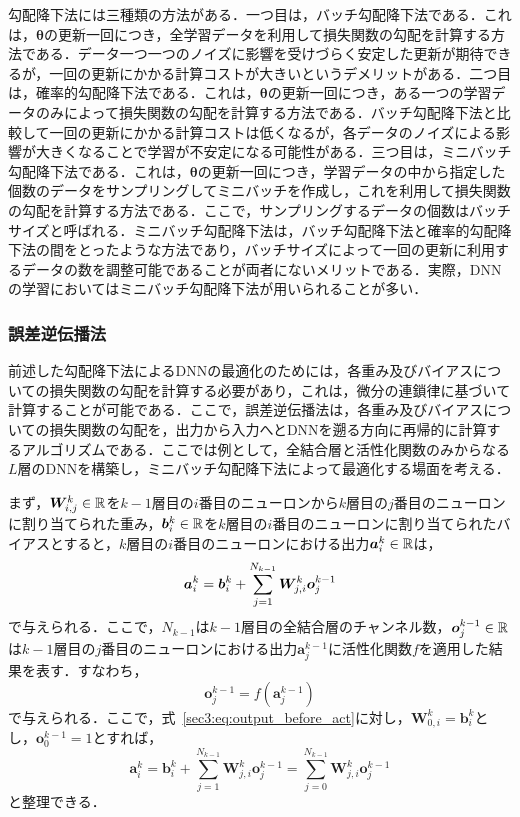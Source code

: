 \documentclass[12pt]{jarticle}
\numberwithin{equation}{section}    %
\numberwithin{figure}{section}      %
\numberwithin{table}{section}      %
\begin{document}
勾配降下法には三種類の方法がある．一つ目は，バッチ勾配降下法である．これは，$\bm{\theta}$の更新一回につき，全学習データを利用して損失関数の勾配を計算する方法である．データ一つ一つのノイズに影響を受けづらく安定した更新が期待できるが，一回の更新にかかる計算コストが大きいというデメリットがある．二つ目は，確率的勾配降下法である．これは，$\bm{\theta}$の更新一回につき，ある一つの学習データのみによって損失関数の勾配を計算する方法である．バッチ勾配降下法と比較して一回の更新にかかる計算コストは低くなるが，各データのノイズによる影響が大きくなることで学習が不安定になる可能性がある．三つ目は，ミニバッチ勾配降下法である．これは，$\bm{\theta}$の更新一回につき，学習データの中から指定した個数のデータをサンプリングしてミニバッチを作成し，これを利用して損失関数の勾配を計算する方法である．ここで，サンプリングするデータの個数はバッチサイズと呼ばれる．ミニバッチ勾配降下法は，バッチ勾配降下法と確率的勾配降下法の間をとったような方法であり，バッチサイズによって一回の更新に利用するデータの数を調整可能であることが両者にないメリットである．実際，DNNの学習においてはミニバッチ勾配降下法が用いられることが多い．

\subsubsection{誤差逆伝播法}
\label{sec3:sec:backpropagation}
前述した勾配降下法によるDNNの最適化のためには，各重み及びバイアスについての損失関数の勾配を計算する必要があり，これは，微分の連鎖律に基づいて計算することが可能である．ここで，誤差逆伝播法は，各重み及びバイアスについての損失関数の勾配を，出力から入力へとDNNを遡る方向に再帰的に計算するアルゴリズムである．ここでは例として，全結合層と活性化関数のみからなる$L$層のDNNを構築し，ミニバッチ勾配降下法によって最適化する場面を考える．

まず，$\bm{W}_{i, j}^{k} \in \mathbb{R}$を$k - 1$層目の$i$番目のニューロンから$k$層目の$j$番目のニューロンに割り当てられた重み，$\bm{b}_{i}^{k} \in \mathbb{R}$を$k$層目の$i$番目のニューロンに割り当てられたバイアスとすると，$k$層目の$i$番目のニューロンにおける出力$\bm{a}_{i}^{k} \in \mathbb{R}$は，
\begin{equation}
    \label{sec3:eq:output_before_act}
    \bm{a}_{i}^{k} = \bm{b}_{i}^{k} + \sum_{j = 1}^{N_{k - 1}} \bm{W}_{j, i}^{k} \bm{o}_{j}^{k - 1}
\end{equation}
で与えられる．ここで，$N_{k - 1}$は$k - 1$層目の全結合層のチャンネル数，$\bm{o}_{j}^{k - 1} \in \mathbb{R}$は$k - 1$層目の$j$番目のニューロンにおける出力$\bm{a}_{j}^{k - 1}$に活性化関数$f$を適用した結果を表す．すなわち，
\begin{equation}
    \bm{o}_{j}^{k - 1} = f(\bm{a}_{j}^{k - 1})
\end{equation}
で与えられる．ここで，式~\eqref{sec3:eq:output_before_act}に対し，$\bm{W}_{0, i}^{k} = \bm{b}_{i}^{k}$とし，$\bm{o}_{0}^{k - 1} = 1$とすれば，
\begin{equation}
    \label{sec3:eq:output_before_act_2}
    \bm{a}_{i}^{k} = \bm{b}_{i}^{k} + \sum_{j = 1}^{N_{k - 1}} \bm{W}_{j, i}^{k} \bm{o}_{j}^{k - 1}
    = \sum_{j = 0}^{N_{k - 1}} \bm{W}_{j, i}^{k} \bm{o}_{j}^{k - 1}
\end{equation}
と整理できる．
\end{document}
